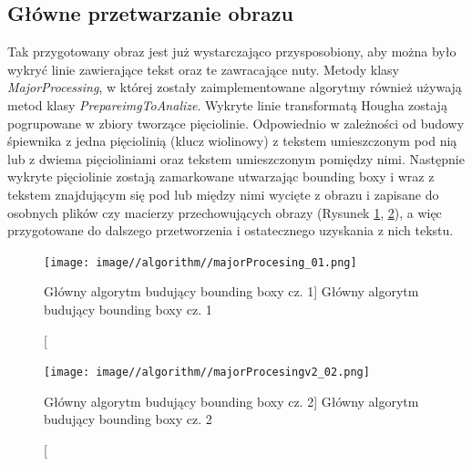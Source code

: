 \documentclass[a4paper,12pt]{article}
\newcommand\spacingIndent{2.2em}
\begin{document}
	    \subsection{Główne przetwarzanie obrazu}
		    \hspace{\spacingIndent}  
		    Tak przygotowany obraz jest już wystarczająco przysposobiony, aby można było wykryć linie zawierające tekst oraz te zawracające nuty.
		    Metody klasy \textit{MajorProcessing}, w której zostały zaimplementowane algorytmy również używają metod klasy \textit{PrepareimgToAnalize}. Wykryte linie transformatą Hougha zostają     pogrupowane w zbiory tworzące pięciolinie. Odpowiednio w zależności od      budowy śpiewnika z jedna pięciolinią (klucz wiolinowy) z tekstem            umieszczonym pod nią lub z dwiema pięcioliniami oraz tekstem umieszczonym     pomiędzy nimi. Następnie wykryte pięciolinie zostają zamarkowane             utwarzając bounding boxy i wraz z tekstem znajdującym się pod lub między     nimi wycięte z obrazu i zapisane do osobnych plików czy macierzy            przechowujących obrazy (Rysunek \ref{fig:boundingBox01}, \ref{fig:boundingBox02}), a więc przygotowane do dalszego przetworzenia i     ostatecznego uzyskania z nich tekstu.
		
			\begin{figure}[!ht]  
			    \begin{center}
				    \texttt{[image: image//algorithm//majorProcesing\_01.png]} 
			    \end{center}
			    \caption
    			    [Główny algorytm budujący bounding boxy cz. 1]  
    			    {Główny algorytm budujący bounding boxy cz. 1}  
    			    \label{fig:boundingBox01}
		    \end{figure}
			
			\newpage
			
	        \begin{figure}[!ht]  
			    \begin{center}
				    \texttt{[image: image//algorithm//majorProcesingv2\_02.png]} 
			    \end{center}
			    \caption
    			    [Główny algorytm budujący bounding boxy cz. 2]  
    			    {Główny algorytm budujący bounding boxy cz. 2}  
    			    \label{fig:boundingBox02}
		    \end{figure} 
		
		
\end{document}
